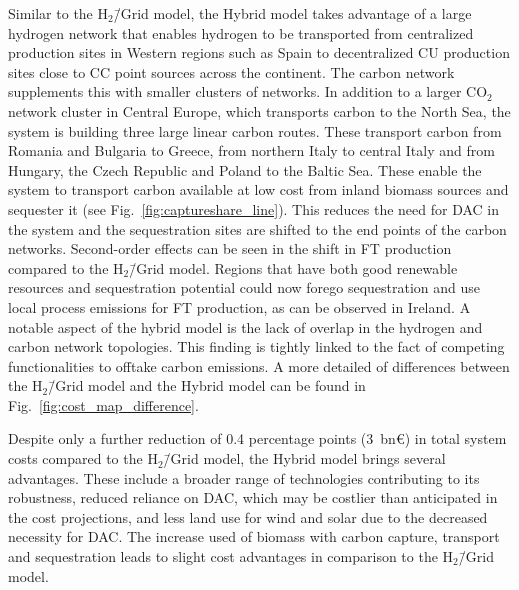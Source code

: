 \documentclass[twocolumn]{article}
\newcommand{\COtwo}{CO$_2$}
\newcommand{\modH}{H$_2$\=/Grid model}
\newcommand{\modHybrid}{Hybrid model}
\begin{document}
Similar to the \modH{}, the \modHybrid{} takes advantage of a large hydrogen network that enables hydrogen to be transported from centralized production sites in Western regions such as Spain to decentralized CU production sites close to CC point sources across the continent.
The carbon network supplements this with smaller clusters of networks. In addition to a larger \COtwo{} network cluster in Central Europe, which transports carbon to the North Sea, the system is building three large linear carbon routes. These transport carbon from Romania and Bulgaria to Greece, from northern Italy to central Italy and from Hungary, the Czech Republic and Poland to the Baltic Sea. These enable the system to transport carbon available at low cost from inland biomass sources and sequester it (see Fig.~\ref{fig:captureshare_line}). This reduces the need for DAC in the system and the sequestration sites are shifted to the end points of the carbon networks. Second-order effects can be seen in the shift in FT production compared to the \modH{}. Regions that have both good renewable resources and sequestration potential could now forego sequestration and use local process emissions for FT production, as can be observed in Ireland. A notable aspect of the hybrid model is the lack of overlap in the hydrogen and carbon network topologies. This finding is tightly linked to the fact of competing functionalities to offtake carbon emissions.
A more detailed of differences between the \modH{} and the \modHybrid{} can be found in Fig.~\ref{fig:cost_map_difference}.



Despite only a further reduction of \label{}0.4 percentage points (\label{}3~bn€) in total system costs compared to the \modH{}, the \modHybrid{} brings several advantages. These include a broader range of technologies contributing to its robustness, reduced reliance on DAC, which may be costlier than anticipated in the cost projections, and less land use for wind and solar due to the decreased necessity for DAC. The increase used of biomass with carbon capture, transport and sequestration leads to slight cost advantages in comparison to the \modH{}.
\end{document}
